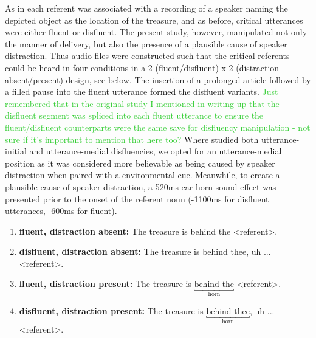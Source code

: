 \documentclass[a4paper,man,natbib]{apa6}
\newcommand\thenote[1]{\textcolor{LimeGreen}{#1}}
\begin{document}
As in \citet{Loy2016} each referent was associated with a recording of a speaker naming the depicted object as the location of the treasure, and as before, critical utterances were either fluent or disfluent. 
The present study, however, manipulated not only the manner of delivery, but also the presence of a plausible cause of speaker distraction. 
Thus audio files were constructed such that the critical referents could be heard in four conditions in a 2 (fluent/disfluent) x 2 (distraction absent/present) design, see below. 
The insertion of a prolonged article followed by a filled pause into the fluent utterance formed the disfluent variants.
\thenote{Just remembered that in the original study I mentioned in writing up that the disfluent segment was spliced into each fluent utterance to ensure the fluent/disfluent counterparts were the same save for disfluency manipulation - not sure if it's important to mention that here too?}
Where \citet{Loy2016} studied both utterance-initial and utterance-medial disfluencies, we opted for an utterance-medial position as it was considered more believable as being caused by speaker distraction when paired with a environmental cue.
Meanwhile, to create a plausible cause of speaker-distraction, a 520ms car-horn sound effect was presented prior to the onset of the referent noun (-1100ms for disfluent utterances, -600ms for fluent). 
\begin{enumerate}
\item \textbf{fluent, distraction absent:} The treasure is behind the \textless referent\textgreater .
\item \textbf{disfluent, distraction absent:} The treasure is behind thee, uh ... \textless referent\textgreater .
\item \textbf{fluent, distraction present:} The treasure is $\underbracket{\text{behind the}}_\text{horn}$ \textless referent\textgreater .
\item \textbf{disfluent, distraction present:} The treasure is $\underbracket{\text{behind thee}}_\text{horn}$, uh ...\textless referent\textgreater .
\end{enumerate}
\end{document}

